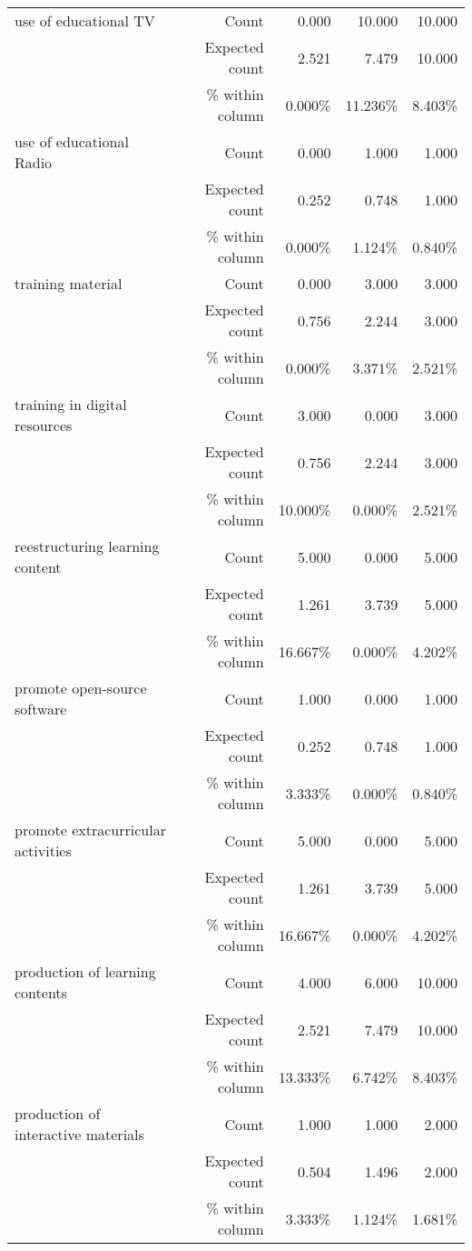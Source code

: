 \documentclass[6pt, oneside]{article}   	%
\begin{document}
\begin{table}[h]
{\begin{tabular}{lrrrr}
			use of educational TV & Count & 0.000 & 10.000 & 10.000  \\
			 & Expected count & 2.521 & 7.479 & 10.000  \\
			 &  \% within column & 0.000\% & 11.236\% & 8.403\%  \\
			use of educational Radio & Count & 0.000 & 1.000 & 1.000  \\
			 & Expected count & 0.252 & 0.748 & 1.000  \\
			 &  \% within column & 0.000\% & 1.124\% & 0.840\%  \\
			training material & Count & 0.000 & 3.000 & 3.000  \\
			 & Expected count & 0.756 & 2.244 & 3.000  \\
			 &  \% within column & 0.000\% & 3.371\% & 2.521\%  \\
			training in digital resources & Count & 3.000 & 0.000 & 3.000  \\
			 & Expected count & 0.756 & 2.244 & 3.000  \\
			 &  \% within column & 10.000\% & 0.000\% & 2.521\%  \\
			reestructuring learning content & Count & 5.000 & 0.000 & 5.000  \\
			 & Expected count & 1.261 & 3.739 & 5.000  \\
			 &  \% within column & 16.667\% & 0.000\% & 4.202\%  \\
			promote open-source software & Count & 1.000 & 0.000 & 1.000  \\
			 & Expected count & 0.252 & 0.748 & 1.000  \\
			 &  \% within column & 3.333\% & 0.000\% & 0.840\%  \\
			promote extracurricular activities & Count & 5.000 & 0.000 & 5.000  \\
			 & Expected count & 1.261 & 3.739 & 5.000  \\
			 &  \% within column & 16.667\% & 0.000\% & 4.202\%  \\
			production of learning contents & Count & 4.000 & 6.000 & 10.000  \\
			 & Expected count & 2.521 & 7.479 & 10.000  \\
			 &  \% within column & 13.333\% & 6.742\% & 8.403\%  \\
			production of interactive materials & Count & 1.000 & 1.000 & 2.000  \\
			 & Expected count & 0.504 & 1.496 & 2.000  \\
			 &  \% within column & 3.333\% & 1.124\% & 1.681\%  \\

\end{tabular}}
\end{table}
\end{document}
